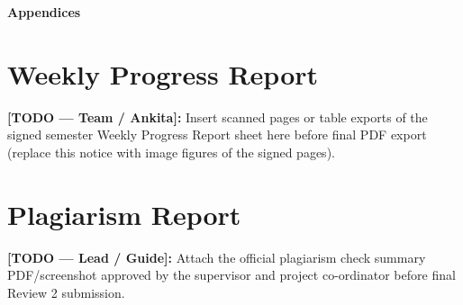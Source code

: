 \documentclass{RAITreport}
\begin{document}








\renewcommand{\bibname}{References}\thispagestyle{plain}




\newpage
\begin{center}
  \vspace*{10cm}
  \centering
  {\huge \bfseries Appendices}
\end{center}

\let\cleardoublepage\clearpage
\appendix

\chapter{Weekly Progress Report}
\noindent\textbf{[TODO — Team / Ankita]:} Insert scanned pages or table exports of the signed semester Weekly Progress Report sheet here before final PDF export (replace this notice with image figures of the signed pages).

\newpage
\chapter{Plagiarism Report}\thispagestyle{plain}
\noindent\textbf{[TODO — Lead / Guide]:} Attach the official plagiarism check summary PDF/screenshot approved by the supervisor and project co-ordinator before final Review 2 submission.
% 

\newpage
\end{document}
